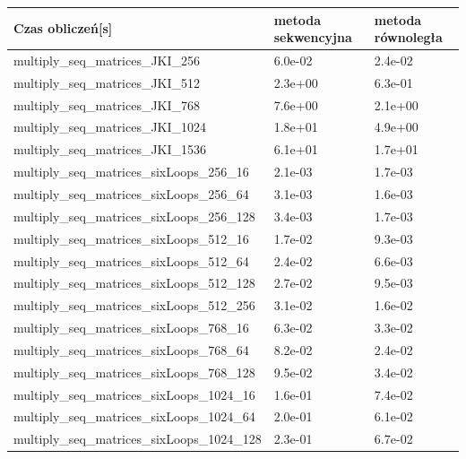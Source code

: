 \documentclass{scrartcl}
\begin{document}
\begin{table}[H]
\begin{tabular}{|l|l|l|}
\hline
Czas obliczeń{[}s{]}               & metoda sekwencyjna & metoda równoległa \\ \hline
multiply\_seq\_matrices\_JKI\_256  & 6.0e-02            & 2.4e-02           \\ \hline
multiply\_seq\_matrices\_JKI\_512  & 2.3e+00            & 6.3e-01           \\ \hline
multiply\_seq\_matrices\_JKI\_768  & 7.6e+00            & 2.1e+00           \\ \hline
multiply\_seq\_matrices\_JKI\_1024 & 1.8e+01            & 4.9e+00           \\ \hline
multiply\_seq\_matrices\_JKI\_1536 & 6.1e+01            & 1.7e+01           \\ \hline
multiply\_seq\_matrices\_sixLoops\_256\_16   & 2.1e-03            & 1.7e-03           \\ \hline
multiply\_seq\_matrices\_sixLoops\_256\_64   & 3.1e-03            & 1.6e-03           \\ \hline
multiply\_seq\_matrices\_sixLoops\_256\_128  & 3.4e-03            & 1.7e-03           \\ \hline
multiply\_seq\_matrices\_sixLoops\_512\_16   & 1.7e-02            & 9.3e-03           \\ \hline
multiply\_seq\_matrices\_sixLoops\_512\_64   & 2.4e-02            & 6.6e-03           \\ \hline
multiply\_seq\_matrices\_sixLoops\_512\_128  & 2.7e-02            & 9.5e-03           \\ \hline
multiply\_seq\_matrices\_sixLoops\_512\_256  & 3.1e-02            & 1.6e-02           \\ \hline
multiply\_seq\_matrices\_sixLoops\_768\_16   & 6.3e-02            & 3.3e-02           \\ \hline
multiply\_seq\_matrices\_sixLoops\_768\_64   & 8.2e-02            & 2.4e-02           \\ \hline
multiply\_seq\_matrices\_sixLoops\_768\_128  & 9.5e-02            & 3.4e-02           \\ \hline
multiply\_seq\_matrices\_sixLoops\_1024\_16  & 1.6e-01            & 7.4e-02           \\ \hline
multiply\_seq\_matrices\_sixLoops\_1024\_64  & 2.0e-01            & 6.1e-02           \\ \hline
multiply\_seq\_matrices\_sixLoops\_1024\_128 & 2.3e-01            & 6.7e-02           \\ \hline

\end{tabular}
\end{table}
\end{document}
